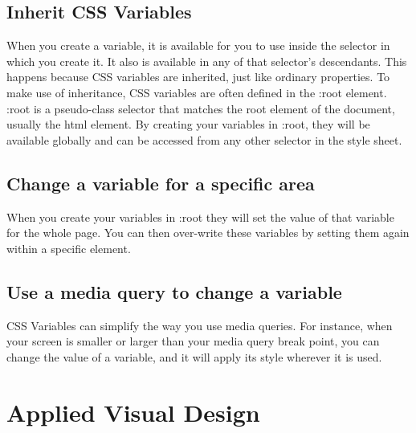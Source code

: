 \documentclass{article}%
\begin{document}
%
\subsection{Inherit CSS Variables}%
\label{subsec:InheritCSSVariables}%
When you create a variable, it is available for you to use inside the selector in which you create it. It also is available in any of that selector's descendants. This happens because CSS variables are inherited, just like ordinary properties.\newline%
To make use of inheritance, CSS variables are often defined in the :root element.\newline%
:root is a pseudo{-}class selector that matches the root element of the document, usually the html element. By creating your variables in :root, they will be available globally and can be accessed from any other selector in the style sheet.\newline%

%
\subsection{Change a variable for a specific area}%
\label{subsec:Changeavariableforaspecificarea}%
When you create your variables in :root they will set the value of that variable for the whole page.\newline%
You can then over{-}write these variables by setting them again within a specific element.\newline%

%
\subsection{Use a media query to change a variable}%
\label{subsec:Useamediaquerytochangeavariable}%
CSS Variables can simplify the way you use media queries.\newline%
For instance, when your screen is smaller or larger than your media query break point, you can change the value of a variable, and it will apply its style wherever it is used.\newline%

%
\newpage%
\section{Applied Visual Design}%
\label{sec:AppliedVisualDesign}%
\end{document}
